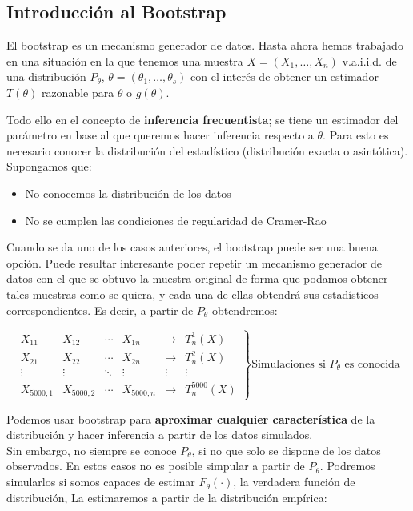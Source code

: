 \subsection{Introducción al Bootstrap}

El bootstrap es un mecanismo generador de datos. Hasta ahora hemos trabajado en una situación en la que tenemos una muestra $X=(X_1,\dots,X_n)$ v.a.i.i.d. de una distribución $P_\theta$, $\theta=(\theta_1,\dots,\theta_s)$ con el interés de obtener un estimador $T(\theta)$ razonable para $\theta$ o $g(\theta)$.

Todo ello en el concepto de \textbf{inferencia frecuentista}; se tiene un estimador del parámetro en base al que queremos hacer inferencia respecto a $\theta$.
Para esto es necesario conocer la distribución del estadístico  (distribución exacta o asintótica). Supongamos que:
\begin{itemize}
    \item No conocemos la distribución de los datos
    \item No se cumplen las condiciones de regularidad de Cramer-Rao
\end{itemize}

Cuando se da uno de los casos anteriores, el bootstrap puede ser una buena opción. Puede resultar interesante poder repetir un mecanismo generador de datos con el que se obtuvo la muestra original de forma que podamos obtener tales muestras como se quiera, y cada una de ellas obtendrá sus estadísticos correspondientes. Es decir, a partir de $P_\theta$ obtendremos:

$$\left.
    \begin{matrix}
        X_{11}     & X_{12}     & \cdots & X_{1n}     & \longrightarrow & T^{1}_n(X)    \\
        X_{21}     & X_{22}     & \cdots & X_{2n}     & \longrightarrow & T^{2}_n(X)    \\
        \vdots     & \vdots     & \ddots & \vdots     & \vdots          & \vdots        \\
        X_{5000,1} & X_{5000,2} & \cdots & X_{5000,n} & \longrightarrow & T^{5000}_n(X)
    \end{matrix}
\right\}\text{Simulaciones si $P_\theta$ es conocida}$$

Podemos usar bootstrap para \textbf{aproximar cualquier característica} de la distribución y hacer inferencia a partir de los datos simulados.\\

Sin embargo, no siempre se conoce $P_\theta$, si no que solo se dispone de los datos observados. En estos casos no es posible simpular a partir de $P_\theta$.
Podremos simularlos si somos capaces de estimar $F_\theta(\cdot)$, la verdadera función de distribución, La estimaremos a partir de la distribución empírica:

